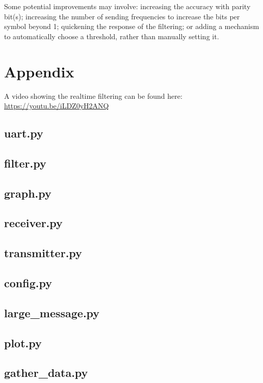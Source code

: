 \documentclass{article}
\begin{document}
\begin{multicols}{2}
Some potential improvements may involve: increasing the accuracy with parity bit(s); increasing the number of sending frequencies to increase the bits per symbol beyond 1; quickening the response of the filtering; or adding a mechanism to automatically choose a threshold, rather than manually setting it.  

\end{multicols}
\pagebreak

\section{Appendix}
A video showing the realtime filtering can be found here: \href{https://youtu.be/iLDZ0yH2ANQ}{https://youtu.be/iLDZ0yH2ANQ}

\subsection{uart.py}


\subsection{filter.py}


\subsection{graph.py}


\subsection{receiver.py}


\subsection{transmitter.py}


\subsection{config.py}


\subsection{large\_message.py}


\subsection{plot.py}


\subsection{gather\_data.py}

\end{document}
